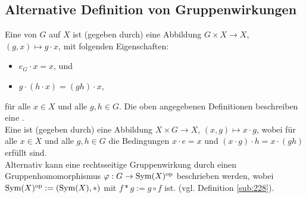 \subsection{Alternative Definition von Gruppenwirkungen} %
\label{sub:anh_1}
Eine  von $G$ auf $X$ ist (gegeben durch) eine Abbildung $G\times X \to X$, $(g,x)\mapsto g\cdot x$, mit folgenden Eigenschaften:
\begin{itemize}
	\item $e_G \cdot x= x$, und
	\item $g\cdot(h\cdot x)=(gh)\cdot x$,
\end{itemize}
für alle $x \in X$ und alle $g,h\in G$.
Die oben angegebenen Definitionen beschreiben eine .\\
Eine  ist (gegeben durch) eine Abbildung $X\times G \to X$, $(x,g)\mapsto x\cdot g$, 
wobei für alle $x\in X$ und alle $g,h\in G$ die Bedingungen $x\cdot e=x$ und $(x\cdot g) \cdot h =x \cdot (gh)$ erfüllt sind.\\
Alternativ kann eine rechtsseitige Gruppenwirkung durch einen Gruppenhomomorphismus $\varphi : G \to \operatorname{Sym}(X)^{\mathrm{op}}$ beschrieben werden, 
wobei $\operatorname{Sym}(X)^{\mathrm{op}}:=(\operatorname{Sym}(X),*)$ mit $f*g:=g\circ f$ ist. (vgl. Definition \ref{sub:228}).
\newpage
{}
\setcounter{page}{1}

\printindex
\listoffigures
\todototoc
{}

